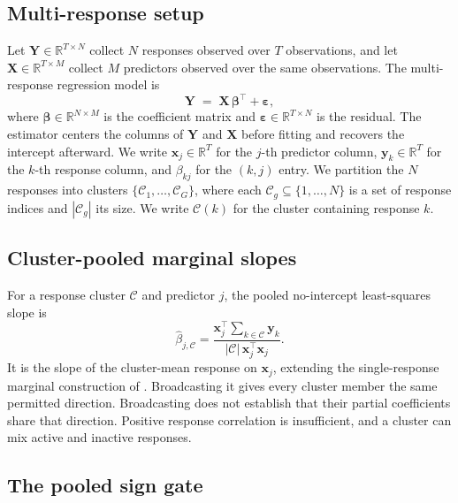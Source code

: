 \documentclass[lineno,pdflatex,sn-basic]{sn-jnl}
\theoremstyle{thmstyleone}
\begin{document}
\subsection{Multi-response setup} \label{sec:setup}

Let $\bm{Y} \in \mathbb{R}^{T \times N}$ collect $N$ responses observed over $T$
observations, and let $\bm{X} \in \mathbb{R}^{T \times M}$ collect $M$ predictors
observed over the same observations. The multi-response regression model is
%
\begin{equation} \label{eq:setup}
	\bm{Y} \;=\; \bm{X}\, \bm{\beta}^\top + \bm{\varepsilon},
\end{equation}
%
where $\bm{\beta} \in \mathbb{R}^{N \times M}$ is the coefficient matrix and
$\bm{\varepsilon} \in \mathbb{R}^{T \times N}$ is the residual. The estimator
centers the columns of $\bm{Y}$ and $\bm{X}$ before fitting and recovers the
intercept afterward. We write $\bm{x}_j \in \mathbb{R}^T$ for the $j$-th
predictor column, $\bm{y}_k \in \mathbb{R}^T$ for the $k$-th response column, and
$\beta_{kj}$ for the $(k, j)$ entry. We partition the $N$ responses into clusters
$\{\mathcal{C}_1, \ldots, \mathcal{C}_G\}$, where each
$\mathcal{C}_g \subseteq \{1, \ldots, N\}$ is a set of response indices and
$|\mathcal{C}_g|$ its size. We write $\mathcal{C}(k)$ for the cluster containing
response $k$.

\subsection{Cluster-pooled marginal slopes} \label{sec:univ-slope}

For a response cluster $\mathcal C$ and predictor $j$, the pooled no-intercept
least-squares slope is
\begin{equation}\label{eq:slope-cluster}
 \hat\beta_{j,\mathcal C}
 =\frac{\bm x_j^\top\sum_{k\in\mathcal C}\bm y_k}
 {|\mathcal C|\,\bm x_j^\top\bm x_j}.
\end{equation}
It is the slope of the cluster-mean response on $\bm x_j$, extending the
single-response marginal construction of
\citet{Chatterjee+Hastie+Tibshirani:2025}. Broadcasting it gives every cluster
member the same permitted direction. Broadcasting does not establish that their
partial coefficients share that direction. Positive response correlation is
insufficient, and a cluster can mix active and inactive responses.

\subsection{The pooled sign gate} \label{sec:gate}
\end{document}
